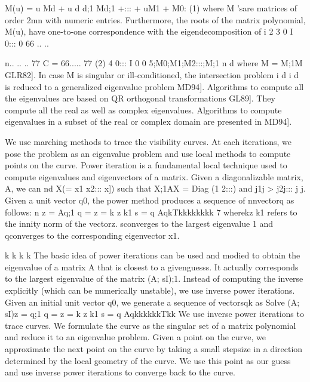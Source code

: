 \documentclass[11pt,letterpaper]{article}
\newcommand{\SectionHeading}[2]{%
  \par\noindent{\fontsize{12}{14}\selectfont\bfseries%
  \if\relax\detokenize{#1}\relax
    #2%
  \else
    #1\hspace{0.35in}#2%
  \fi\par}\vspace{0.1em}%
}
\begin{document}
M(u) = u Md + u d d;1 Md;1 +::: + uM1 + M0: (1) where M 'sare matrices of order 2mn with numeric entries. Furthermore, the roots of the matrix polynomial, M(u), have one-to-one correspondence with the eigendecomposition of i 2 3 0 I 0::: 0 66 .. ..

n.. .. .. 77 C = 66..... 77 (2) 4 0::: I 0 0 5;M0;M1;M2:::;M;1 n d where M = M;1M GLR82]. In case M is singular or ill-conditioned, the intersection problem i d i d is reduced to a generalized eigenvalue problem MD94]. Algorithms to compute all the eigenvalues are based on QR orthogonal transformations GL89]. They compute all the real as well as complex eigenvalues. Algorithms to compute eigenvalues in a subset of the real or complex domain are presented in MD94].

\SectionHeading{2.4}{Power Iterations}
We use marching methods to trace the visibility curves. At each iterations, we pose the problem as an eigenvalue problem and use local methods to compute points on the curve. Power iteration is a fundamental local technique used to compute eigenvalues and eigenvectors of a matrix. Given a diagonalizable matrix, A, we can nd X(= x1 x2::: x]) such that X;1AX = Diag (1 2:::) and j1j > j2j::: j j. Given a unit vector q0, the power method produces a sequence of nnvectorq as follows: n z = Aq;1 q = z = k z k1 s = q AqkTkkkkkkkk 7 wherekz k1 refers to the innity norm of the vectorz. sconverges to the largest eigenvalue 1 and qconverges to the corresponding eigenvector x1.

k k k k The basic idea of power iterations can be used and modied to obtain the eigenvalue of a matrix A that is closest to a givenguesss. It actually corresponds to the largest eigenvalue of the matrix (A; sI);1. Instead of computing the inverse explicitly (which can be numerically unstable), we use inverse power iterations. Given an initial unit vector q0, we generate a sequence of vectorsqk as Solve (A; sI)z = q;1 q = z = k z k1 s = q AqkkkkkkTkk We use inverse power iterations to trace curves. We formulate the curve as the singular set of a matrix polynomial and reduce it to an eigenvalue problem. Given a point on the curve, we approximate the next point on the curve by taking a small stepsize in a direction determined by the local geometry of the curve. We use this point as our guess and use inverse power iterations to converge back to the curve.
\end{document}
